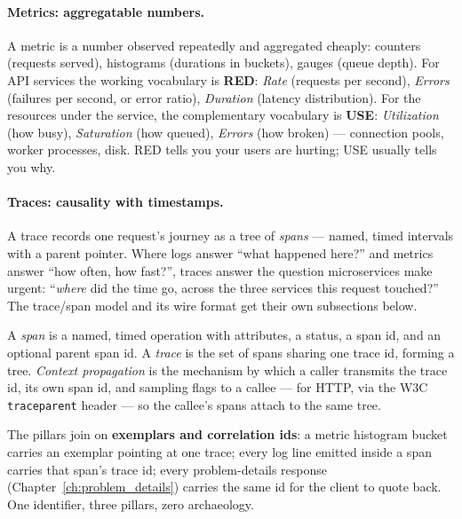 \paragraph{Metrics: aggregatable numbers.} A metric is a number observed
repeatedly and aggregated cheaply: counters (requests served), histograms
(durations in buckets), gauges (queue depth). For API services the working
vocabulary is \textbf{RED}: \emph{Rate} (requests per second),
\emph{Errors} (failures per second, or error ratio), \emph{Duration}
(latency distribution). For the resources under the service, the
complementary vocabulary is \textbf{USE}: \emph{Utilization} (how busy),
\emph{Saturation} (how queued), \emph{Errors} (how broken) --- connection
pools, worker processes, disk. RED tells you your users are hurting; USE
usually tells you why.

\paragraph{Traces: causality with timestamps.} A trace records one request's
journey as a tree of \emph{spans} --- named, timed intervals with a parent
pointer. Where logs answer ``what happened here?'' and metrics answer ``how
often, how fast?'', traces answer the question microservices make urgent:
``\emph{where} did the time go, across the three services this request
touched?'' The trace/span model and its wire format get their own
subsections below.

\begin{definition}
A \emph{span} is a named, timed operation with attributes, a status, a
span id, and an optional parent span id. A \emph{trace} is the set of spans
sharing one trace id, forming a tree. \emph{Context propagation} is the
mechanism by which a caller transmits the trace id, its own span id, and
sampling flags to a callee --- for HTTP, via the W3C \texttt{traceparent}
header --- so the callee's spans attach to the same tree.
\end{definition}

\begin{keyconceptbox}
The pillars join on \textbf{exemplars and correlation ids}: a metric
histogram bucket carries an exemplar pointing at one trace; every log line
emitted inside a span carries that span's trace id; every problem-details
response (Chapter~\ref{ch:problem_details}) carries the same id for the
client to quote back. One identifier, three pillars, zero archaeology.
\end{keyconceptbox}

